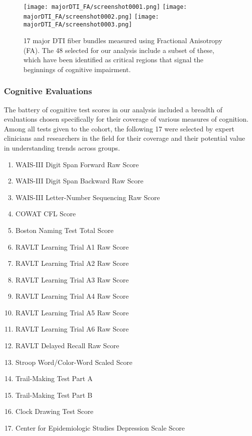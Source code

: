 \begin{figure*}
\centering
  \texttt{[image: majorDTI\_FA/screenshot0001.png]}
  \texttt{[image: majorDTI\_FA/screenshot0002.png]}
  \texttt{[image: majorDTI\_FA/screenshot0003.png]}
  \caption{\label{fig:majorDTI}17 major DTI fiber bundles measured using Fractional Anisotropy (FA). The 48 selected for our analysis include a subset of these, which have been identified as critical regions that signal the beginnings of cognitive impairment.}
\end{figure*}

\newpage

\subsubsection*{Cognitive Evaluations}
The battery of cognitive test scores in our analysis included a breadth of evaluations chosen specifically for their coverage of various measures of cognition. Among all tests given to the cohort, the following 17 were selected by expert clinicians and researchers in the field for their coverage and their potential value in understanding trends across groups.
{\small
\begin{multicols}{2}
\begin{enumerate}
\item WAIS-III Digit Span Forward Raw Score
\item WAIS-III Digit Span Backward Raw Score
\item WAIS-III Letter-Number Sequencing Raw Score
\item COWAT CFL Score
\item Boston Naming Test Total Score
\item RAVLT Learning Trial A1 Raw Score
\item RAVLT Learning Trial A2 Raw Score
\item RAVLT Learning Trial A3 Raw Score
\item RAVLT Learning Trial A4 Raw Score
\item RAVLT Learning Trial A5 Raw Score
\item RAVLT Learning Trial A6 Raw Score
\item RAVLT Delayed Recall Raw Score
\item Stroop Word/Color-Word Scaled Score
\item Trail-Making Test Part A
\item Trail-Making Test Part B
\item Clock Drawing Test Score
\item Center for Epidemiologic Studies Depression Scale Score
\end{enumerate} 
\end{multicols}
}

